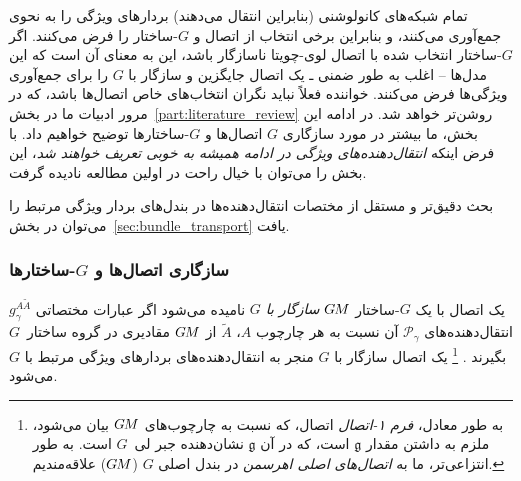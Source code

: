 تمام شبکه‌های کانولوشنی (بنابراین انتقال می‌دهند) بردارهای ویژگی را به نحوی جمع‌آوری می‌کنند، و بنابراین برخی انتخاب از اتصال و $G$-ساختار را فرض می‌کنند.
اگر $G$-ساختار انتخاب شده با اتصال لوی-چویتا ناسازگار باشد، این به معنای آن است که این مدل‌ها -- اغلب به طور ضمنی ـ یک اتصال جایگزین و سازگار با $G$ را برای جمع‌آوری ویژگی‌ها فرض می‌کنند.
خواننده فعلاً نباید نگران انتخاب‌های خاص اتصال‌ها باشد، که در مرور ادبیات ما در بخش~\ref{part:literature_review} روشن‌تر خواهد شد.
در ادامه این بخش، ما بیشتر در مورد سازگاری $G$ اتصال‌ها و $G$-ساختارها توضیح خواهیم داد.
با فرض اینکه \emph{انتقال‌دهنده‌های ویژگی در ادامه همیشه به خوبی تعریف خواهند شد}، این بخش را می‌توان با خیال راحت در اولین مطالعه نادیده گرفت.

بحث دقیق‌تر و مستقل از مختصات انتقال‌دهنده‌ها در بندل‌های بردار ویژگی مرتبط را می‌توان در بخش~\ref{sec:bundle_transport} یافت.


\subsubsection{سازگاری اتصال‌ها و \textit{$G$}-ساختارها}

یک اتصال با یک $G$-ساختار $G\mkern-1.4muM$ \emph{سازگار با $G$} نامیده می‌شود اگر عبارات مختصاتی $g_\gamma^{A\widetilde{A}}$ انتقال‌دهنده‌های $\mathcal{P}_\gamma$ آن نسبت به هر چارچوب $A$، $\widetilde{A}$ از $G\mkern-1.4muM$ مقادیری در گروه ساختار~$G$ بگیرند \cite{wendlLectureNotesBundles2008}.%
\footnote{
	به طور معادل، \emph{فرم ۱-اتصال} اتصال، که نسبت به چارچوب‌های $G\mkern-1.4muM$ بیان می‌شود، ملزم به داشتن مقدار $\mathfrak{g}$ است، که در آن $\mathfrak{g}$ نشان‌دهنده جبر لی~$G$ است.
	به طور انتزاعی‌تر، ما به \emph{اتصال‌های اصلی اهرسمن} در بندل اصلی $G$ ($G\mkern-1.4muM$) علاقه‌مندیم.
}
یک اتصال سازگار با $G$ منجر به انتقال‌دهنده‌های بردارهای ویژگی مرتبط با $G$ می‌شود.

